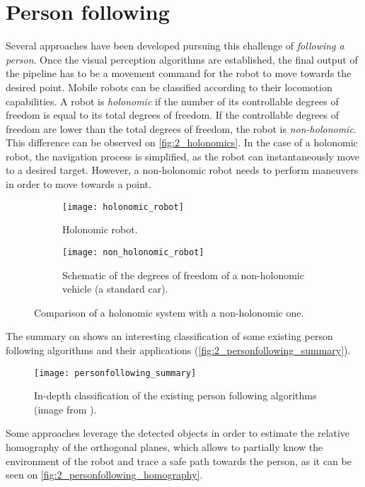 \section{Person following}
\label{sec:2_following}
Several approaches have been developed pursuing this challenge of \textit{following a person}. Once the visual perception algorithms are established, the final output of the pipeline has to be a movement command for the robot to move towards the desired point. Mobile  robots can be classified according to their locomotion capabilities. A robot is \textit{holonomic} if the number of its controllable degrees of freedom is equal to its total degrees of freedom. If the controllable degrees of freedom are lower than the total degrees of freedom, the robot is \textit{non-holonomic}. This difference can be observed on \autoref{fig:2_holonomics}. In the case of a holonomic robot, the navigation process is simplified, as the robot can instantaneously move to a desired target. However, a non-holonomic robot needs to perform maneuvers in order to move towards a point.\\


\begin{figure}[h]
	\centering
	\begin{subfigure}[t]{0.45\linewidth}
		\centering
		\texttt{[image: holonomic\_robot]}
		\caption{Holonomic robot.}
	\end{subfigure}
	\begin{subfigure}[t]{0.45\linewidth}
	\centering
	\texttt{[image: non\_holonomic\_robot]}
	\caption{Schematic of the degrees of freedom of a non-holonomic vehicle (a standard car).}
	\end{subfigure}
	\caption{Comparison of a holonomic system with a non-holonomic one.}
	\label{fig:2_holonomics}
\end{figure}

The summary on \cite{personfollowing_summary} shows an interesting classification of some existing person following algorithms and their applications (\autoref{fig:2_personfollowing_summary}).


\begin{figure}[h]
	\centering
	\texttt{[image: personfollowing\_summary]}
	\caption{In-depth classification of the existing person following algorithms (image from \cite{personfollowing_summary}).}
	\label{fig:2_personfollowing_summary}
\end{figure}

Some approaches leverage the detected objects in order to estimate the relative homography of the orthogonal planes, which allows to partially know the environment of the robot and trace a safe path towards the person, as it can be seen on \autoref{fig:2_personfollowing_homography}.

